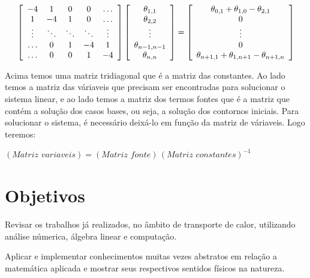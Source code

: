\documentclass[12pt,a4paper]{article}
\begin{document}
$$\left[
\begin{array}{c c c c c}
-4& 1 & 0 & 0 & \ldots \\
1 & -4 & 1 & 0 & \ldots\\
\vdots& \ddots & \ddots & \ddots & \vdots \\
\ldots & 0 & 1 & -4 & 1 \\
\ldots & 0 & 0 & 1 & -4
\end{array}\right]     
\left[
\begin{array}{c}
\theta_{1, 1}\\
\theta_{2, 2}\\
\vdots\\
\theta_{n-1, n-1}\\
\theta_{n, n}
\end{array}\right] = 
\left[
\begin{array}{c}
\theta_{0, 1} + \theta_{1, 0} - \theta_{2, 1} \\
0\\
\vdots\\
0\\
\theta_{n+1, 1} + \theta_{1, n+1} - \theta_{n+1, n}
\end{array}\right]
$$

Acima temos uma matriz tridiagonal que é a matriz das constantes. Ao lado temos a matriz das váriaveis que precisam ser encontradas para solucionar o sistema linear, e ao lado temos a matriz dos termos fontes que é a matriz que contém a solução dos casos bases, ou seja, a solução dos contornos iniciais. Para solucionar o sistema, é necessário deixá-lo em função da matriz de váriaveis. Logo teremos:

\newline

\begin{one}

\centering $(Matriz \,\, variaveis) = (Matriz \,\, fonte) \, (Matriz \,\, constantes)^{-1}$

\end{one}

\newline


\section{Objetivos}

Revisar os trabalhos já realizados, no âmbito de transporte de calor, utilizando análise númerica, álgebra linear e computação.

Aplicar e implementar conhecimentos muitas vezes abstratos em relação a matemática aplicada e mostrar seus respectivos sentidos físicos na natureza.
\end{document}
